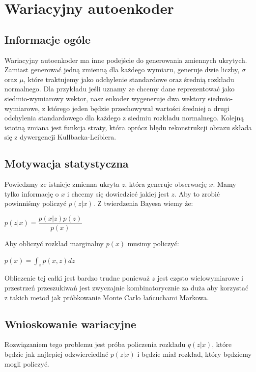 \documentclass[a4paper,12pt]{book} %
\begin{document}
\chapter{Wariacyjny autoenkoder}
\section{Informacje ogóle}
Wariacyjny autoenkoder ma inne podejście do generowania zmiennych ukrytych. Zamiast generować jedną zmienną dla każdego wymiaru, generuje dwie liczby, $\sigma$ oraz $\mu$, które traktujemy jako odchylenie standardowe oraz średnią rozkładu normalnego.
Dla przykładu jeśli uznamy ze chcemy dane reprezentować jako siedmio-wymiarowy wektor, nasz enkoder wygeneruje dwa wektory siedmio-wymiarowe, z którego jeden będzie przechowywał wartości średniej a drugi odchylenia standardowego dla każdego z siedmiu rozkładu normalnego. Kolejną istotną zmiana jest funkcja straty, która oprócz błędu rekonstrukcji obrazu składa się z dywergencji Kullbacka-Leiblera.\\
\section{Motywacja statystyczna}
Powiedzmy ze istnieje zmienna ukryta $z$, która generuje obserwację $x$. Mamy tylko informację o $x$ i chcemy się dowiedzieć jakiej jest $z$. Aby to zrobić powinniśmy policzyć $p(z|x)$. Z twierdzenia Bayesa wiemy że:\\
\begin{center}
	$p(z|x)=\dfrac{p(x|z)p(z)}{p(x)}$
\end{center}
Aby obliczyć rozkład marginalny $p(x)$ musimy policzyć:
\begin{center}
	$p(x) = \displaystyle\int_{z}^{}p(x,z)dz$
\end{center}
Obliczenie tej całki jest bardzo trudne ponieważ $z$ jest często wielowymiarowe i przestrzeń przeszukiwań jest zwyczajnie kombinatorycznie za duża aby korzystać z takich metod jak próbkowanie Monte Carlo łańcuchami Markowa. \\

\section{Wnioskowanie wariacyjne}
Rozwiązaniem tego problemu jest próba policzenia rozkładu $q(z|x)$, które będzie jak najlepiej odzwierciedlać $p(z|x)$ i będzie miał rozkład, który będziemy mogli policzyć. 
\end{document}

